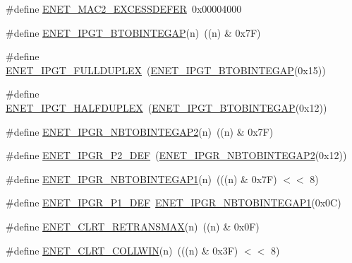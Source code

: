 \begin{DoxyCompactItemize}
\item 
\#define \hyperlink{group___e_n_e_t__17_x_x__40_x_x_gaadf555a1169009b0dbb728dbc5046b14}{E\+N\+E\+T\+\_\+\+M\+A\+C2\+\_\+\+E\+X\+C\+E\+S\+S\+D\+E\+F\+E\+R}~0x00004000
\item 
\#define \hyperlink{group___e_n_e_t__17_x_x__40_x_x_ga7cdae0530c55e9f236d7d9d5bde3391a}{E\+N\+E\+T\+\_\+\+I\+P\+G\+T\+\_\+\+B\+T\+O\+B\+I\+N\+T\+E\+G\+A\+P}(n)~((n) \& 0x7\+F)
\item 
\#define \hyperlink{group___e_n_e_t__17_x_x__40_x_x_gabcaea91a823fd58281d82d9dcb754c2f}{E\+N\+E\+T\+\_\+\+I\+P\+G\+T\+\_\+\+F\+U\+L\+L\+D\+U\+P\+L\+E\+X}~(\hyperlink{group___e_n_e_t__17_x_x__40_x_x_ga7cdae0530c55e9f236d7d9d5bde3391a}{E\+N\+E\+T\+\_\+\+I\+P\+G\+T\+\_\+\+B\+T\+O\+B\+I\+N\+T\+E\+G\+A\+P}(0x15))
\item 
\#define \hyperlink{group___e_n_e_t__17_x_x__40_x_x_ga4c98e396a39809243d38a68b27eeec02}{E\+N\+E\+T\+\_\+\+I\+P\+G\+T\+\_\+\+H\+A\+L\+F\+D\+U\+P\+L\+E\+X}~(\hyperlink{group___e_n_e_t__17_x_x__40_x_x_ga7cdae0530c55e9f236d7d9d5bde3391a}{E\+N\+E\+T\+\_\+\+I\+P\+G\+T\+\_\+\+B\+T\+O\+B\+I\+N\+T\+E\+G\+A\+P}(0x12))
\item 
\#define \hyperlink{group___e_n_e_t__17_x_x__40_x_x_gab665d33e25749c26b32f51b2a9e14b79}{E\+N\+E\+T\+\_\+\+I\+P\+G\+R\+\_\+\+N\+B\+T\+O\+B\+I\+N\+T\+E\+G\+A\+P2}(n)~((n) \& 0x7\+F)
\item 
\#define \hyperlink{group___e_n_e_t__17_x_x__40_x_x_gacb2c77e9648c3945d156149617c6d620}{E\+N\+E\+T\+\_\+\+I\+P\+G\+R\+\_\+\+P2\+\_\+\+D\+E\+F}~(\hyperlink{group___e_n_e_t__17_x_x__40_x_x_gab665d33e25749c26b32f51b2a9e14b79}{E\+N\+E\+T\+\_\+\+I\+P\+G\+R\+\_\+\+N\+B\+T\+O\+B\+I\+N\+T\+E\+G\+A\+P2}(0x12))
\item 
\#define \hyperlink{group___e_n_e_t__17_x_x__40_x_x_ga346ffe9920e1abd20950e001e920d1fb}{E\+N\+E\+T\+\_\+\+I\+P\+G\+R\+\_\+\+N\+B\+T\+O\+B\+I\+N\+T\+E\+G\+A\+P1}(n)~(((n) \& 0x7\+F) $<$$<$ 8)
\item 
\#define \hyperlink{group___e_n_e_t__17_x_x__40_x_x_gabb7222a12e8e058581bca37fd98cbbe5}{E\+N\+E\+T\+\_\+\+I\+P\+G\+R\+\_\+\+P1\+\_\+\+D\+E\+F}~\hyperlink{group___e_n_e_t__17_x_x__40_x_x_ga346ffe9920e1abd20950e001e920d1fb}{E\+N\+E\+T\+\_\+\+I\+P\+G\+R\+\_\+\+N\+B\+T\+O\+B\+I\+N\+T\+E\+G\+A\+P1}(0x0\+C)
\item 
\#define \hyperlink{group___e_n_e_t__17_x_x__40_x_x_ga2e261dd603d1a1909d1b00e11634a958}{E\+N\+E\+T\+\_\+\+C\+L\+R\+T\+\_\+\+R\+E\+T\+R\+A\+N\+S\+M\+A\+X}(n)~((n) \& 0x0\+F)
\item 
\#define \hyperlink{group___e_n_e_t__17_x_x__40_x_x_ga541a85ac1f97834806ea7bd907ca7ef5}{E\+N\+E\+T\+\_\+\+C\+L\+R\+T\+\_\+\+C\+O\+L\+L\+W\+I\+N}(n)~(((n) \& 0x3\+F) $<$$<$ 8)

\end{DoxyCompactItemize}
